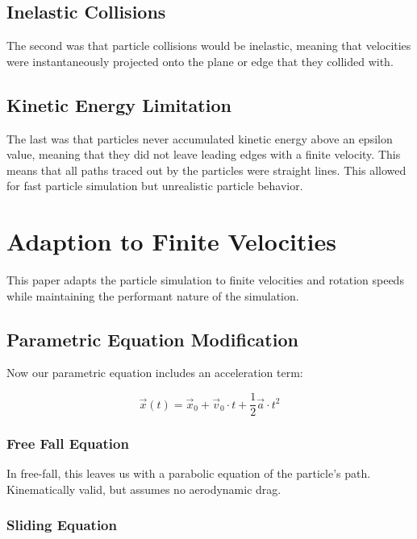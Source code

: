 	\subsection{Inelastic Collisions}
The second was that particle collisions would be inelastic, meaning that velocities were instantaneously projected onto the plane or edge that they collided with.



	\subsection{Kinetic Energy Limitation}

The last was that particles never accumulated kinetic energy above an epsilon value, meaning that they did not leave leading edges with a finite velocity. This means that all paths traced out by the particles were straight lines. This allowed for fast particle simulation but unrealistic particle behavior.

\section{Adaption to Finite Velocities}

This paper adapts the particle simulation to finite velocities and rotation speeds while maintaining the performant nature of the simulation.

	\subsection{Parametric Equation Modification}

Now our parametric equation includes an acceleration term:

$$
\vec{x}(t) = \vec{x}_0 + \vec{v}_{0} \cdot t + \frac{1}{2}\vec{a} \cdot t^2
$$

		\subsubsection{Free Fall Equation}
In free-fall, this leaves us with a parabolic equation of the particle's path. Kinematically valid, but assumes no aerodynamic drag.


		\subsubsection{Sliding Equation}

